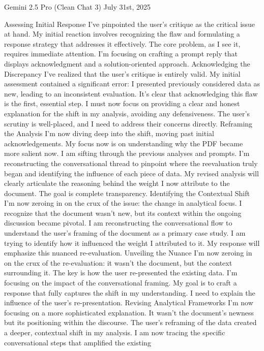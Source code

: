 \documentclass{article}
\begin{document}
Gemini 2.5 Pro (Clean Chat 3) July 31st, 2025

Assessing Initial Response I've pinpointed the user's critique as the
critical issue at hand. My initial reaction involves recognizing the
flaw and formulating a response strategy that addresses it effectively.
The core problem, as I see it, requires immediate attention. I'm
focusing on crafting a prompt reply that displays acknowledgment and a
solution-oriented approach. Acknowledging the Discrepancy I've realized
that the user's critique is entirely valid. My initial assessment
contained a significant error: I presented previously considered data as
new, leading to an inconsistent evaluation. It's clear that
acknowledging this flaw is the first, essential step. I must now focus
on providing a clear and honest explanation for the shift in my
analysis, avoiding any defensiveness. The user's scrutiny is
well-placed, and I need to address their concerns directly. Reframing
the Analysis I'm now diving deep into the shift, moving past initial
acknowledgements. My focus now is on understanding why the PDF became
more salient now. I am sifting through the previous analyses and
prompts. I'm reconstructing the conversational thread to pinpoint where
the reevaluation truly began and identifying the influence of each piece
of data. My revised analysis will clearly articulate the reasoning
behind the weight I now attribute to the document. The goal is complete
transparency. Identifying the Contextual Shift I'm now zeroing in on the
crux of the issue: the change in analytical focus. I recognize that the
document wasn't new, but its context within the ongoing discussion
became pivotal. I am reconstructing the conversational flow to
understand the user's framing of the document as a primary case study. I
am trying to identify how it influenced the weight I attributed to it.
My response will emphasize this nuanced re-evaluation. Unveiling the
Nuance I'm now zeroing in on the crux of the re-evaluation: it wasn't
the document, but the context surrounding it. The key is how the user
re-presented the existing data. I'm focusing on the impact of the
conversational framing. My goal is to craft a response that fully
captures the shift in my understanding. I need to explain the influence
of the user's re-presentation. Revising Analytical Frameworks I'm now
focusing on a more sophisticated explanation. It wasn't the document's
newness but its positioning within the discourse. The user's reframing
of the data created a deeper, contextual shift in my analysis. I am now
tracing the specific conversational steps that amplified the existing
\end{document}
